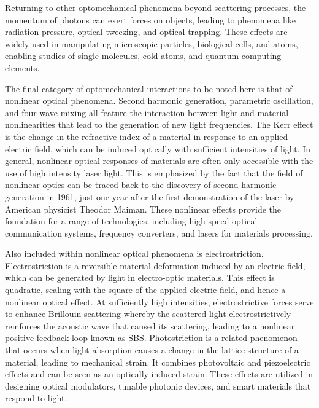 Returning to other optomechanical phenomena beyond scattering processes, the momentum of photons can exert forces on objects, leading to phenomena like radiation pressure, optical tweezing, and optical trapping. These effects are widely used in manipulating microscopic particles\cite{}, biological cells\cite{}, and atoms\cite{}, enabling studies of single molecules\cite{}, cold atoms\cite{}, and quantum computing elements\cite{}.

The final category of optomechanical interactions to be noted here is that of nonlinear optical phenomena. Second harmonic generation, parametric oscillation, and four-wave mixing all feature the interaction between light and material nonlinearities that lead to the generation of new light frequencies.\cite{boyd2020nonlinear} The Kerr effect is the change in the refractive index of a material in response to an applied electric field, which can be induced optically with sufficient intensities of light. In general, nonlinear optical responses of materials are often only accessible with the use of high intensity laser light. This is emphasized by the fact that the field of nonlinear optics can be traced back to the discovery of second-harmonic generation in 1961\cite{franken1961generation}, just one year after the first demonstration of the laser by American physicist Theodor Maiman.\cite{maiman1960stimulated} These nonlinear effects provide the foundation for a range of technologies, including high-speed optical communication systems\cite{}, frequency converters\cite{}, and lasers for materials processing\cite{}.

Also included within nonlinear optical phenomena is electrostriction. Electrostriction is a reversible material deformation induced by an electric field, which can be generated by light in electro-optic materials. This effect is quadratic, scaling with the square of the applied electric field, and hence a nonlinear optical effect. At sufficiently high intensities, electrostrictive forces serve to enhance Brillouin scattering whereby the scattered light electrostrictively reinforces the acoustic wave that caused its scattering, leading to a nonlinear positive feedback loop known as \ac{SBS}. Photostriction is a related phenomenon that occurs when light absorption causes a change in the lattice structure of a material, leading to mechanical strain. It combines photovoltaic and piezoelectric effects and can be seen as an optically induced strain. These effects are utilized in designing optical modulators\cite{}, tunable photonic devices\cite{}, and smart materials that respond to light\cite{}.




